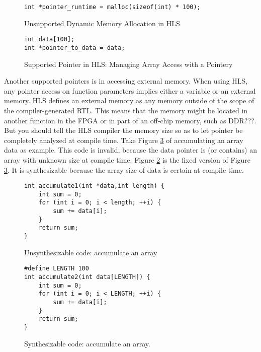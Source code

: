 \documentclass[conference]{IEEEtran}
\begin{document}
\begin{figure}[h]\centering
{\fontsize{8}{8}\selectfont
\begin{lstlisting}[frame=lines]
int *pointer_runtime = malloc(sizeof(int) * 100);
\end{lstlisting}
}
\caption{Unsupported Dynamic Memory Allocation in HLS}\label{Unsupported-Dynamic-Memory}
\end{figure}

\begin{figure}[h]\centering
{\fontsize{8}{8}\selectfont
\begin{lstlisting}[frame=lines]
int data[100];
int *pointer_to_data = data;
\end{lstlisting}
}
\caption{Supported Pointer in HLS: Managing Array Access with a Pointery}\label{Supported-Pointer-in-HLS}
\end{figure}

Another supported pointers is in accessing external memory. When using HLS, any pointer access on function parameters implies either a variable or an external memory. HLS defines an external memory as any memory outside of the scope of the compiler-generated RTL. This means that the memory might be located in another function in the FPGA or in part of an off-chip memory, such as DDR???. But you should tell the HLS compiler the memory size so as to let  pointer be completely analyzed at compile time. Take Figure \ref{Unsynthesizable-code} of accumulating an array data as example. This code is invalid, because the data pointer is (or contains) an array with unknown size at compile time. Figure \ref{Supported-Pointer-in-HLS} is the fixed version of Figure \ref{Unsynthesizable-code}. It is synthesizable because the array size of data is certain at compile time.

\begin{figure}[h]\centering
{\fontsize{8}{8}\selectfont
\begin{lstlisting}[frame=lines]
int accumulate1(int *data,int length) {
    int sum = 0;
    for (int i = 0; i < length; ++i) {
        sum += data[i];
    }
    return sum;
}
\end{lstlisting}
}
\caption{Unsynthesizable code: accumulate an array}\label{Unsynthesizable-code}
\end{figure}


\begin{figure}[h]\centering
{\fontsize{8}{8}\selectfont
\begin{lstlisting}[frame=lines]
#define LENGTH 100
int accumulate2(int data[LENGTH]) {
    int sum = 0;
    for (int i = 0; i < LENGTH; ++i) {
        sum += data[i];
    }
    return sum;
}
\end{lstlisting}
}
\caption{Synthesizable code: accumulate an array.}\label{Synthesizable-code}
\end{figure}
\end{document}
